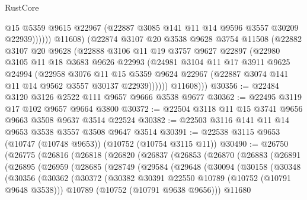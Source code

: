 \begin{lexlean}{RustCore}
\begin{coremodule}
                    @15
                    @5359
                    @9615
                    @22967
                    (@22887 @3085 @141 @11 @14 @9596 @3557 @30209 @22939))))))
          @11608)
        (@22874
          @3107
          @20
          @3538
          @9628
          @3754
          @11508
          (@22882
            @3107
            @20
            @9628
            (@22888
              @3106
              @11
              @19
              @3757
              @9627
              @22897
              (@22980
                @3105
                @11
                @18
                @3683
                @9626
                @22993
                (@24981
                  @3104
                  @11
                  @17
                  @3911
                  @9625
                  @24994
                  (@22958
                    @3076
                    @11
                    @15
                    @5359
                    @9624
                    @22967
                    (@22887 @3074 @141 @11 @14 @9562 @3557 @30137 @22939))))))
          @11608)))
@30356 := @22484 @3120 @3126 @2522 @111 @9657 @9666 @3538 @9677
@30362 := @22495 @3119 @17 @102 @9657 @9664 @3800
@30372 := @22504 @3118 @11 @15 @3741 @9656 @9663 @3508 @9637 @3514 @22524
@30382 := @22503 @3116 @141 @11 @14 @9653 @3538 @3557 @3508 @9647 @3514
@30391 := @22538 @3115 @9653 (@10747 (@10748 @9653)) (@10752 (@10754 @3115 @11))
@30490 := @26750
    (@26775
      (@26816
        (@26818
          (@26820
            (@26837
              (@26853
                (@26870
                  (@26883
                    (@26891
                      (@26895
                        (@26959
                          (@28685
                            (@28749
                              (@29584
                                (@29648
                                  (@30094
                                    (@30158
                                      (@30348
                                        (@30356
                                          (@30362
                                            (@30372
                                              (@30382
                                                @30391
                                                @22550
                                                @10789
                                                (@10752 (@10791 @9648 @3538)))
                                              @10789
                                              (@10752 (@10791 @9638 @9656)))
                                            @11680

\end{coremodule}
\end{lexlean}
